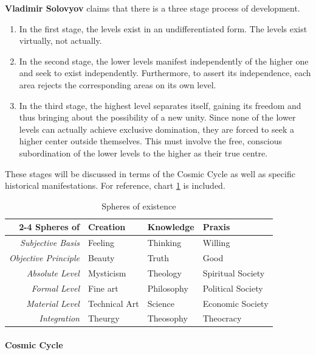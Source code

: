 \textbf{Vladimir Solovyov} claims that there is a three stage process of development.

\begin{enumerate}
\item In the first stage, the levels exist in an undifferentiated form. The levels exist virtually, not actually. 
\item In the second stage, the lower levels manifest independently of the higher one and seek to exist independently. Furthermore, to assert its independence, each area rejects the corresponding areas on its own level. 
\item In the third stage, the highest level separates itself, gaining its freedom and thus bringing about the possibility of a new unity. Since none of the lower levels can actually achieve exclusive domination, they are forced to seek a higher center outside themselves. This must involve the free, conscious subordination of the lower levels to the higher as their true centre. 
\end{enumerate}
These stages will be discussed in terms of the Cosmic Cycle as well as specific historical manifestations. For reference, chart \ref{tab:SpheresofExistence} is included.

\begin{table}[h]\centering\small
\begin{tabularx}{\textwidth}{rXXX}\cmidrule(lr){2-4}
 \textbf{Spheres of} &
\textbf{Creation} &
\textbf{Knowledge} &
\textbf{Praxis}\\\midrule
\textit{Subjective Basis} &
Feeling &
Thinking &
Willing\\
\textit{Objective Principle} &
Beauty &
Truth &
Good\\
\textit{Absolute Level} &
Mysticism &
Theology &
Spiritual Society\\
\textit{Formal Level} &
Fine art &
Philosophy &
Political Society\\
\textit{Material Level} &
Technical Art &
Science &
Economic Society\\
\textit{Integration} &
Theurgy &
Theosophy &
Theocracy\\\bottomrule
\end{tabularx}
\label{tab:SpheresofExistence}
\caption{Spheres of existence}
\end{table}

\paragraph{Cosmic Cycle}

